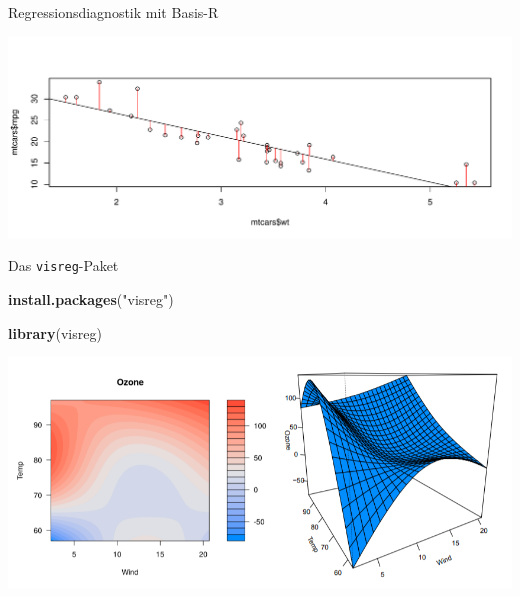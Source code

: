 \documentclass[ignorenonframetext,]{beamer}
\newenvironment{Shaded}{\begin{snugshade}}{\end{snugshade}}
\newcommand{\KeywordTok}[1]{\textcolor[rgb]{0.13,0.29,0.53}{\textbf{#1}}}
\newcommand{\DataTypeTok}[1]{\textcolor[rgb]{0.13,0.29,0.53}{#1}}
\newcommand{\StringTok}[1]{\textcolor[rgb]{0.31,0.60,0.02}{#1}}
\newcommand{\OperatorTok}[1]{\textcolor[rgb]{0.81,0.36,0.00}{\textbf{#1}}}
\newcommand{\NormalTok}[1]{#1}
\begin{document}
\begin{frame}[fragile]{Regressionsdiagnostik mit Basis-R}

\begin{Shaded}
\end{Shaded}

\includegraphics{B3_linreg_files/figure-beamer/unnamed-chunk-25-1.pdf}

\end{frame}

\begin{frame}[fragile]{Das \texttt{visreg}-Paket}

\begin{Shaded}
\begin{Highlighting}[]
\KeywordTok{install.packages}\NormalTok{(}\StringTok{"visreg"}\NormalTok{)}
\end{Highlighting}
\end{Shaded}

\begin{Shaded}
\begin{Highlighting}[]
\KeywordTok{library}\NormalTok{(visreg)}
\end{Highlighting}
\end{Shaded}

\includegraphics{figure/visreg.PNG}

\end{frame}
\end{document}
